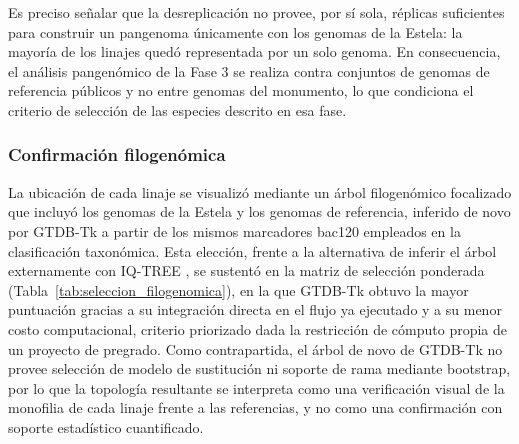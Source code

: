 Es preciso señalar que la desreplicación no provee, por sí sola, réplicas suficientes para construir un pangenoma únicamente con los genomas de la Estela: la mayoría de los linajes quedó representada por un solo genoma. En consecuencia, el análisis pangenómico de la Fase 3 se realiza contra conjuntos de genomas de referencia públicos y no entre genomas del monumento, lo que condiciona el criterio de selección de las especies descrito en esa fase.

\subsubsection{Confirmación filogenómica}

La ubicación de cada linaje se visualizó mediante un árbol filogenómico focalizado que incluyó los genomas de la Estela y los genomas de referencia, inferido de novo por GTDB-Tk \cite{gtdbtk2019} a partir de los mismos marcadores bac120 empleados en la clasificación taxonómica. Esta elección, frente a la alternativa de inferir el árbol externamente con IQ-TREE \cite{minh2020}, se sustentó en la matriz de selección ponderada (Tabla~\ref{tab:seleccion_filogenomica}), en la que GTDB-Tk obtuvo la mayor puntuación gracias a su integración directa en el flujo ya ejecutado y a su menor costo computacional, criterio priorizado dada la restricción de cómputo propia de un proyecto de pregrado. Como contrapartida, el árbol de novo de GTDB-Tk no provee selección de modelo de sustitución ni soporte de rama mediante bootstrap, por lo que la topología resultante se interpreta como una verificación visual de la monofilia de cada linaje frente a las referencias, y no como una confirmación con soporte estadístico cuantificado.

